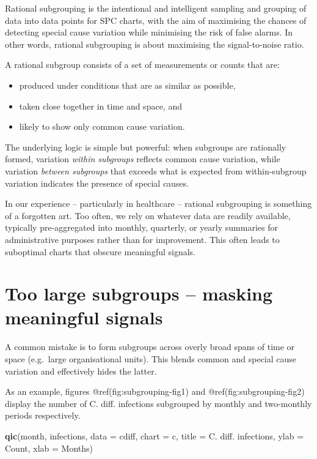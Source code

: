 \documentclass[
]{book}
\newenvironment{Shaded}{\begin{snugshade}}{\end{snugshade}}
\newcommand{\AttributeTok}[1]{\textcolor[rgb]{0.13,0.29,0.53}{#1}}
\newcommand{\FunctionTok}[1]{\textcolor[rgb]{0.13,0.29,0.53}{\textbf{#1}}}
\newcommand{\NormalTok}[1]{#1}
\newcommand{\StringTok}[1]{\textcolor[rgb]{0.31,0.60,0.02}{#1}}
\providecommand{\tightlist}{%
  \setlength{\itemsep}{0pt}\setlength{\parskip}{0pt}}
\begin{document}
Rational subgrouping is the intentional and intelligent sampling and
grouping of data into data points for SPC charts, with the aim of
maximising the chances of detecting special cause variation while
minimising the risk of false alarms. In other words, rational
subgrouping is about maximising the signal-to-noise ratio.

A rational subgroup consists of a set of measurements or counts that
are:

\begin{itemize}
\tightlist
\item
  produced under conditions that are as similar as possible,
\item
  taken close together in time and space, and
\item
  likely to show only common cause variation.
\end{itemize}

The underlying logic is simple but powerful: when subgroups are
rationally formed, variation \emph{within subgroups} reflects common
cause variation, while variation \emph{between subgroups} that exceeds
what is expected from within-subgroup variation indicates the presence
of special causes.

In our experience -- particularly in healthcare -- rational subgrouping
is something of a forgotten art. Too often, we rely on whatever data are
readily available, typically pre-aggregated into monthly, quarterly, or
yearly summaries for administrative purposes rather than for
improvement. This often leads to suboptimal charts that obscure
meaningful signals.

\section{Too large subgroups -- masking meaningful
signals}\label{too-large-subgroups-masking-meaningful-signals}

A common mistake is to form subgroups across overly broad spans of time
or space (e.g.~large organisational units). This blends common and
special cause variation and effectively hides the latter.

As an example, figures @ref(fig:subgrouping-fig1) and
@ref(fig:subgrouping-fig2) display the number of C. diff. infections
subgrouped by monthly and two-monthly periods respectively.

\begin{Shaded}
\begin{Highlighting}[]
\FunctionTok{qic}\NormalTok{(month, infections, }
    \AttributeTok{data  =}\NormalTok{ cdiff, }
    \AttributeTok{chart =} \StringTok{\textquotesingle{}c\textquotesingle{}}\NormalTok{,}
    \AttributeTok{title =} \StringTok{\textquotesingle{}C. diff. infections\textquotesingle{}}\NormalTok{,}
    \AttributeTok{ylab  =} \StringTok{\textquotesingle{}Count\textquotesingle{}}\NormalTok{,}
    \AttributeTok{xlab  =} \StringTok{\textquotesingle{}Months\textquotesingle{}}\NormalTok{)}
\end{Highlighting}
\end{Shaded}
\end{document}
